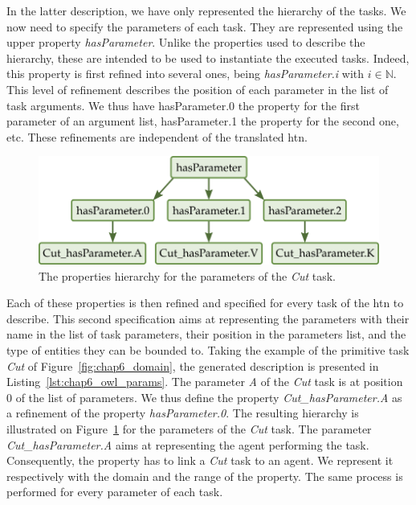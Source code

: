 In the latter description, we have only represented the hierarchy of the tasks. We now need to specify the parameters of each task. They are represented using the upper property \textit{hasParameter}. Unlike the properties used to describe the hierarchy, these are intended to be used to instantiate the executed tasks. Indeed, this property is first refined into several ones, being \textit{hasParameter.i} with $i \in \mathbb{N}$. This level of refinement describes the position of each parameter in the list of task arguments. We thus have hasParameter.0 the property for the first parameter of an argument list, hasParameter.1 the property for the second one, etc. These refinements are independent of the translated \acrshort{htn}.

\begin{figure}[h!]
\centering
\includegraphics[scale=0.4]{figures/chapter6/rbox_params.png}
\caption{\label{fig:chap6_rbox_params} The properties hierarchy for the parameters of the \textit{Cut} task.}
\end{figure}

Each of these properties is then refined and specified for every task of the \acrshort{htn} to describe. This second specification aims at representing the parameters with their name in the list of task parameters, their position in the parameters list, and the type of entities they can be bounded to. Taking the example of the primitive task \textit{Cut} of Figure~\ref{fig:chap6_domain}, the generated description is presented in Listing~\ref{lst:chap6_owl_params}. The parameter \textit{A} of the \textit{Cut} task is at position 0 of the list of parameters. We thus define the property \textit{Cut\_hasParameter.A} as a refinement of the property \textit{hasParameter.0}. The resulting hierarchy is illustrated on Figure~\ref{fig:chap6_rbox_params} for the parameters of the \textit{Cut} task. The parameter \textit{Cut\_hasParameter.A} aims at representing the agent performing the task. Consequently, the property has to link a \textit{Cut} task to an agent. We represent it respectively with the domain and the range of the property. The same process is performed for every parameter of each task.


